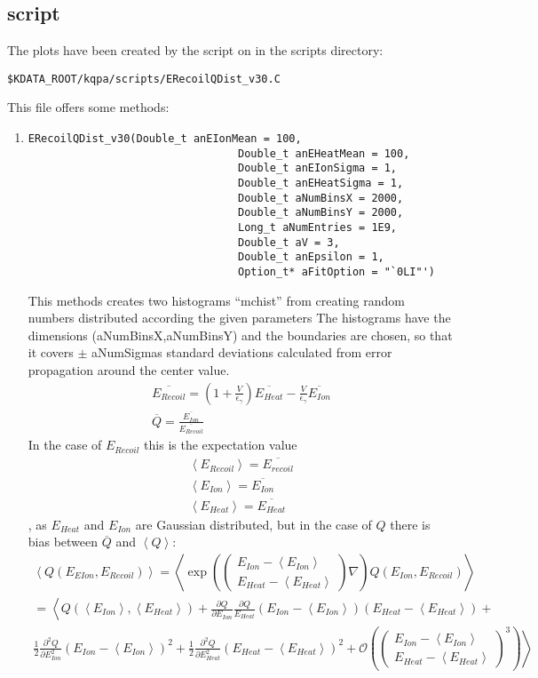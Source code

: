 \documentclass[10pt, a4paper]{article}
\newcommand{\mean}[1]{\left \langle #1 \right \rangle}
\begin{document}
\subsection{script}
The plots have been created by the script on in the scripts directory:
\begin{verbatim}
$KDATA_ROOT/kqpa/scripts/ERecoilQDist_v30.C
\end{verbatim}
This file offers some methods:
\begin{enumerate}
\item \begin{verbatim}
ERecoilQDist_v30(Double_t anEIonMean = 100,
								 Double_t anEHeatMean = 100,
								 Double_t anEIonSigma = 1,
								 Double_t anEHeatSigma = 1,
								 Double_t aNumBinsX = 2000,
								 Double_t aNumBinsY = 2000,
								 Long_t aNumEntries = 1E9,
								 Double_t aV = 3,
								 Double_t anEpsilon = 1,
								 Option_t* aFitOption = "`0LI"')
\end{verbatim}
This methods creates two histograms "`mchist"' from creating random numbers distributed according the given parameters The histograms have the dimensions (aNumBinsX,aNumBinsY) and the boundaries are chosen, so that it covers $\pm$ aNumSigmas standard deviations calculated from error propagation around the center value.
\begin{gather}
\overline{E_{Recoil}} = \left(1 + \frac{V}{\epsilon_\gamma} \right) \overline{E_{Heat}} - \frac{V}{\epsilon_\gamma} \overline{E_{Ion}} \\
\overline{Q} = \frac{\overline{E_{Ion}}}{\overline{E_{Recoil}}} 
\end{gather}
In the case of $E_{Recoil}$ this is the expectation value
\begin{gather}
\mean{E_{Recoil}} = \overline{E_{recoil}} \\
\mean{E_{Ion}} = \overline{E_{Ion}} \\
\mean{E_{Heat}} = \overline{E_{Heat}}
\end{gather}
, as $E_{Heat}$ and $E_{Ion}$ are Gaussian distributed, but in the case of $Q$
there is bias between $\overline{Q}$ and $\mean{Q}$: 
\begin{gather}
\mean{Q(E_{EIon},E_{Recoil})} = \mean{\exp \left( \begin{pmatrix} E_{Ion} - \mean{E_{Ion}} \\ E_{Heat} - \mean{E_{Heat}} \end{pmatrix} \nabla \right) Q(E_{Ion},E_{Recoil})} \\
= \mean{Q(\mean{E_{Ion}},\mean{E_{Heat}}) + \frac{\partial Q}{\partial E_{Ion}} \frac{\partial Q}{E_{Heat}} (E_{Ion} - \mean{E_{Ion}})(E_{Heat} - \mean{E_{Heat}}) + \right. \\ \left. \frac{1}{2} \frac{\partial^2 Q}{\partial E_{Ion}^2} (E_{Ion} - \mean{E_{Ion}})^2 + \frac{1}{2} \frac{\partial^2 Q}{\partial E_{Heat}^2} (E_{Heat} - \mean{E_{Heat}})^2 + \mathcal O \left( \begin{pmatrix} E_{Ion} - \mean{E_{Ion}} \\ E_{Heat} - \mean{E_{Heat}} \end{pmatrix}^3 \right)} \\

\end{gather}
\end{enumerate}
\end{document}
